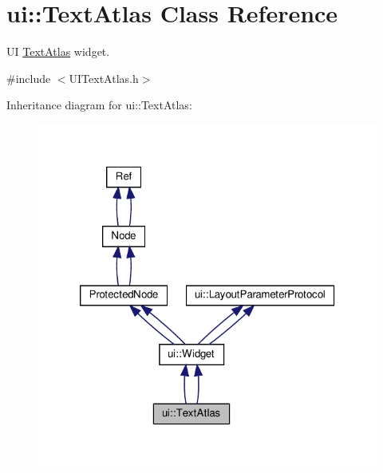 \hypertarget{classui_1_1TextAtlas}{}\section{ui\+:\+:Text\+Atlas Class Reference}
\label{classui_1_1TextAtlas}


UI \hyperlink{classui_1_1TextAtlas}{Text\+Atlas} widget.  




{\ttfamily \#include $<$U\+I\+Text\+Atlas.\+h$>$}



Inheritance diagram for ui\+:\+:Text\+Atlas\+:
\nopagebreak
\begin{figure}[H]
\begin{center}
\leavevmode
\includegraphics[width=320pt]{classui_1_1TextAtlas__inherit__graph}
\end{center}
\end{figure}


